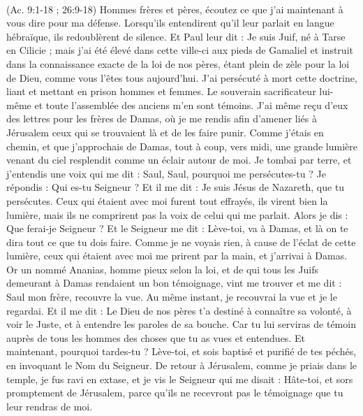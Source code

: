 \begin{multicols}{2}
{\\(Ac. 9:1-18 ; 26:9-18)}
\VerseOne{}Hommes frères et pères, écoutez ce que j’ai maintenant à vous dire pour ma défense.
Lorsqu’ils entendirent qu’il leur parlait en langue hébraïque, ils redoublèrent de silence. Et Paul leur dit :
Je suis Juif, né à Tarse en Cilicie ; mais j’ai été élevé dans cette ville-ci aux pieds de Gamaliel et instruit dans la connaissance exacte de la loi de nos pères, étant plein de zèle pour la loi de Dieu, comme vous l'êtes tous aujourd'hui.
J’ai persécuté à mort cette doctrine, liant et mettant en prison hommes et femmes.
Le souverain sacrificateur lui-même et toute l'assemblée des anciens m'en sont témoins. J’ai même reçu d’eux des lettres pour les frères de Damas, où je me rendis afin d’amener liés à Jérusalem ceux qui se trouvaient là et de les faire punir.
Comme j’étais en chemin, et que j'approchais de Damas, tout à coup, vers midi, une grande lumière venant du ciel resplendit comme un éclair autour de moi.
Je tombai par terre, et j'entendis une voix qui me dit : Saul, Saul, pourquoi me persécutes-tu ?
Je répondis : Qui es-tu Seigneur ? Et il me dit : Je suis Jésus de Nazareth, que tu persécutes.
Ceux qui étaient avec moi furent tout effrayés, ils virent bien la lumière, mais ils ne comprirent pas la voix de celui qui me parlait. Alors je dis : Que ferai-je Seigneur ?
Et le Seigneur me dit : Lève-toi, va à Damas, et là on te dira tout ce que tu dois faire.
Comme je ne voyais rien, à cause de l’éclat de cette lumière, ceux qui étaient avec moi me prirent par la main, et j’arrivai à Damas.
Or un nommé Ananias, homme pieux selon la loi, et de qui tous les Juifs demeurant à Damas rendaient un bon témoignage, vint me trouver
et me dit : Saul mon frère, recouvre la vue. Au même instant, je recouvrai la vue et je le regardai.
Et il me dit : Le Dieu de nos pères t'a destiné à connaître sa volonté, à voir le Juste, et à entendre les paroles de sa bouche.
Car tu lui serviras de témoin auprès de tous les hommes des choses que tu as vues et entendues.
Et maintenant, pourquoi tardes-tu ? Lève-toi, et sois baptisé et purifié de tes péchés, en invoquant le Nom du Seigneur.
De retour à Jérusalem, comme je priais dans le temple, je fus ravi en extase,
et je vis le Seigneur qui me disait : Hâte-toi, et sors promptement de Jérusalem, parce qu’ils ne recevront pas le témoignage que tu leur rendras de moi.

\end{multicols}

